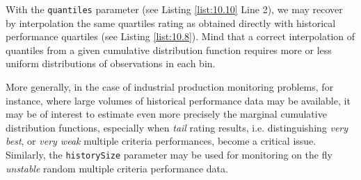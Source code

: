 With the \texttt{quantiles} parameter (see Listing \ref{list:10.10} Line 2), we may recover by interpolation the same quartiles rating as obtained directly with historical performance quartiles (see Listing \ref{list:10.8}). Mind that a correct interpolation of quantiles from a given cumulative distribution function requires more or less uniform distributions of observations in each bin. 

More generally, in the case of industrial production monitoring problems, for instance, where large volumes of historical performance data may be available, it may be of interest to estimate even more precisely the marginal cumulative distribution functions, especially when \emph{tail} rating results, i.e. distinguishing \emph{very best}, or \emph{very weak} multiple criteria performances, become a critical issue. Similarly, the \texttt{historySize} parameter may be used for monitoring on the fly \emph{unstable} random multiple criteria performance data.  	
 
